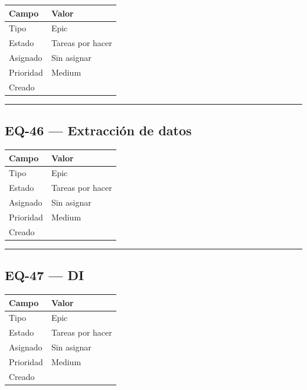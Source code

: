 \documentclass[
  spanish,
  11pt,
]{report}
\newcounter{none} %
\begin{document}
{\def\LTcaptype{none} %
\begin{longtable}[]{@{}ll@{}}
\toprule\noalign{}
Campo & Valor \\
\midrule\noalign{}
\endhead
\bottomrule\noalign{}
\endlastfoot
Tipo & Epic \\
Estado & Tareas por hacer \\
Asignado & Sin asignar \\
Prioridad & Medium \\
Creado & \\
\end{longtable}
}

\begin{center}\rule{0.5\linewidth}{0.5pt}\end{center}

\subsection{EQ-46 --- Extracción de
datos}\label{eq-46-extracciuxf3n-de-datos}

{\def\LTcaptype{none} %
\begin{longtable}[]{@{}ll@{}}
\toprule\noalign{}
Campo & Valor \\
\midrule\noalign{}
\endhead
\bottomrule\noalign{}
\endlastfoot
Tipo & Epic \\
Estado & Tareas por hacer \\
Asignado & Sin asignar \\
Prioridad & Medium \\
Creado & \\
\end{longtable}
}

\begin{center}\rule{0.5\linewidth}{0.5pt}\end{center}

\subsection{EQ-47 --- DI}\label{eq-47-di}

{\def\LTcaptype{none} %
\begin{longtable}[]{@{}ll@{}}
\toprule\noalign{}
Campo & Valor \\
\midrule\noalign{}
\endhead
\bottomrule\noalign{}
\endlastfoot
Tipo & Epic \\
Estado & Tareas por hacer \\
Asignado & Sin asignar \\
Prioridad & Medium \\
Creado & \\
\end{longtable}
}
\end{document}
